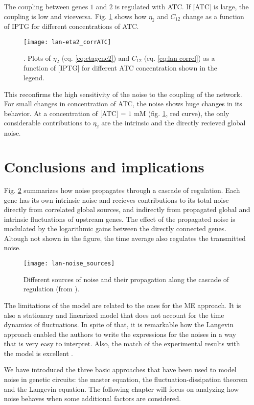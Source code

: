 The coupling between genes $1$ and $2$ is regulated with ATC. If [ATC] is large, the coupling is low and viceversa. Fig. \ref{fig:lan-eta2_corrATC} shows how $\eta_2$ and $C_{12}$ change as a function of IPTG for different concentrations of ATC.

\begin{figure}[H]
  \centering
  \texttt{[image: lan-eta2\_corrATC]}
  \caption[Noise in gene $2$ for varying ATC concentrations]{\label{fig:lan-eta2_corrATC}. Plots of $\eta_2$ (eq. \eqref{eq:etagene2}) and $C_{12}$ (eq. \eqref{eq:lan-correl}) as a function of [IPTG] for different ATC concentration shown in the legend.}
\end{figure}

This reconfirms the high sensitivity of the noise to the coupling of the network. For small changes in concentration of ATC, the noise shows huge changes in its behavior. At a concentration of [ATC] = $1$ mM (fig. \ref{fig:lan-eta2_corrATC}, red curve), the only considerable contributions to $\eta_2$ are the intrinsic and the directly recieved global noise.

\section{Conclusions and implications}

Fig. \ref{fig:lan-noise_sources} summarizes how noise propagates through a cascade of regulation. Each gene has its own intrinsic noise and recieves contributions to its total noise directly from correlated global sources, and indirectly from propagated global and intrinsic fluctuations of upstream genes. The effect of the propagated noise is modulated by the logarithmic gains between the directly connected genes. Altough not shown in the figure, the time average also regulates the transmitted noise.

\begin{figure}[H]
  \centering
  \texttt{[image: lan-noise\_sources]}
  \caption[Propagation of noise through a cascade]{\label{fig:lan-noise_sources} Different sources of noise and their propagation along the cascade of regulation (from \cite{pedraza05}).}
\end{figure}

The limitations of the model are related to the ones for the ME approach. It is also a stationary and linearized model that does not account for the time dynamics of fluctuations. In spite of that, it is remarkable how the Langevin approach enabled the authors to write the expressions for the noises in a way that is very easy to interpret. Also, the match of the experimental results with the model is excellent \cite{pedraza05} \cite{pedraza06}.

We have introduced the three basic approaches that have been used to model noise in genetic circuits: the master equation, the fluctuation-dissipation theorem and the Langevin equation. The following chapter will focus on analyzing how noise behaves when some additional factors are considered.
